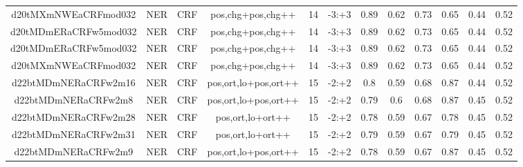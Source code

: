 \documentclass[a4paper]{article}
\begin{document}
\begin{landscape}
\begin{center}
\begin{tabular}{ |c|c|c|c|c|c|c|c|c|c|c|c|}
 	
 
 	
 		
 		\small{ d20tMXmNWEaCRFmod032 } & NER & CRF & pos,chg+pos,chg++  &  14 &  -3:+3  &  0.89 & 0.62 & 0.73  &  0.65 & 0.44 & 0.52 \\
 		

 	
 
 	
 		
 		\small{ d20tMDmERaCRFw5mod032 } & NER & CRF & pos,chg+pos,chg++  &  14 &  -3:+3  &  0.89 & 0.62 & 0.73  &  0.65 & 0.44 & 0.52 \\
 		

 	
 
 	
 		
 		\small{ d20tMDmERaCRFw5mod032 } & NER & CRF & pos,chg+pos,chg++  &  14 &  -3:+3  &  0.89 & 0.62 & 0.73  &  0.65 & 0.44 & 0.52 \\
 		

 	
 
 	
 		
 		\small{ d20tMXmNWEaCRFmod032 } & NER & CRF & pos,chg+pos,chg++  &  14 &  -3:+3  &  0.89 & 0.62 & 0.73  &  0.65 & 0.44 & 0.52 \\
 		

 	
 
 	
 		
 		\small{ d22btMDmNERaCRFw2m16 } & NER & CRF & pos,ort,lo+pos,ort++  &  15 &  -2:+2  &  0.8 & 0.59 & 0.68  &  0.87 & 0.44 & 0.52 \\
 		

 	
 
 	
 		
 		\small{ d22btMDmNERaCRFw2m8 } & NER & CRF & pos,ort,lo+pos,ort++  &  15 &  -2:+2  &  0.79 & 0.6 & 0.68  &  0.87 & 0.45 & 0.52 \\
 		

 	
 
 	
 		
 		\small{ d22btMDmNERaCRFw2m28 } & NER & CRF & pos,ort,lo+ort++  &  15 &  -2:+2  &  0.78 & 0.59 & 0.67  &  0.78 & 0.45 & 0.52 \\
 		

 	
 
 	
 		
 		\small{ d22btMDmNERaCRFw2m31 } & NER & CRF & pos,ort,lo+ort++  &  15 &  -2:+2  &  0.79 & 0.59 & 0.67  &  0.79 & 0.45 & 0.52 \\
 		

 	
 
 	
 		
 		\small{ d22btMDmNERaCRFw2m9 } & NER & CRF & pos,ort,lo+pos,ort++  &  15 &  -2:+2  &  0.78 & 0.59 & 0.67  &  0.87 & 0.45 & 0.52 \\
 		


\end{tabular}
\end{center}
\end{landscape}
\end{document}
